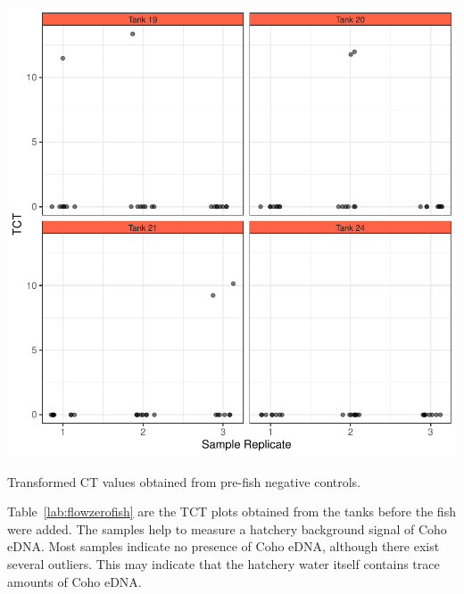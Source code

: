 \begin{table}[H]
\includegraphics[scale=0.8]{Chapter4Images/zerofishtct.pdf}
\caption{Transformed CT values obtained from pre-fish negative controls. }
\label{lab:flowzerofish}
\end{table}

Table~\ref{lab:flowzerofish} are the TCT plots obtained from the tanks before the fish were added. The samples help to measure a hatchery background signal of Coho eDNA. Most samples indicate no presence of Coho eDNA, although there exist several outliers. This may indicate that the hatchery water itself contains trace amounts of Coho eDNA.




